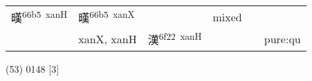 \documentclass[14pt,a4paper]{scrartcl}
\begin{document}
\begin{longtable}[c]{@{}llllll@{}}
\begin{minipage}[t]{0.14\columnwidth}
暵\textsuperscript{66b5~xanH}
\strut\end{minipage} &
\begin{minipage}[t]{0.14\columnwidth}\raggedright\strut
暵\textsuperscript{66b5~xanX}
\strut\end{minipage} &
\begin{minipage}[t]{0.14\columnwidth}\raggedright\strut
\strut\end{minipage} &
\begin{minipage}[t]{0.14\columnwidth}\raggedright\strut
mixed
\strut\end{minipage}\tabularnewline
\begin{minipage}[t]{0.14\columnwidth}\raggedright\strut
𩁢
\strut\end{minipage} &
\begin{minipage}[t]{0.14\columnwidth}\raggedright\strut
xanX, xanH
\strut\end{minipage} &
\begin{minipage}[t]{0.14\columnwidth}\raggedright\strut
漢\textsuperscript{6f22~xanH}
\strut\end{minipage} &
\begin{minipage}[t]{0.14\columnwidth}\raggedright\strut
\strut\end{minipage} &
\begin{minipage}[t]{0.14\columnwidth}\raggedright\strut
\strut\end{minipage} &
\begin{minipage}[t]{0.14\columnwidth}\raggedright\strut
pure:qu
\strut\end{minipage}\tabularnewline
\bottomrule
\end{longtable}

(53) 0148 {[}3{]}
\end{document}
